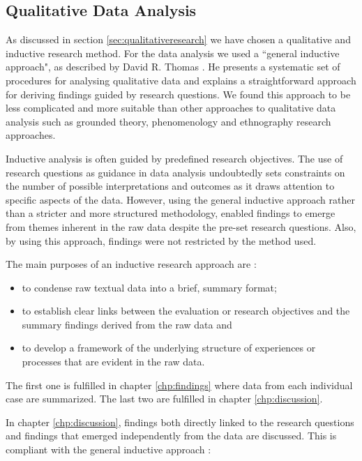 \subsection{Qualitative Data Analysis}
\label{sec:qualitativeAnalysis}
As discussed in section \ref{sec:qualitativeresearch} we have chosen a qualitative and inductive research method. For the data analysis we used a ``general inductive approach", as described by David R. Thomas \cite{thomas2006general}. He presents a systematic set of procedures for analysing qualitative data and explains a straightforward approach for deriving findings guided by research questions. We found this approach to be less complicated and more suitable than other approaches to qualitative data analysis such as grounded theory, phenomenology and ethnography research approaches\cite{thorne2000data}.

Inductive analysis is often guided by predefined research objectives. The use of research questions as guidance in data analysis undoubtedly sets constraints on the number of possible interpretations and outcomes as it draws attention to specific aspects of the data. However, using the general inductive approach rather than a stricter and more structured methodology, enabled findings to emerge from themes inherent in the raw data despite the pre-set research questions. Also, by using this approach, findings were not restricted by the method used. 

The main purposes of an inductive research approach are \cite{thomas2006general}: 
\begin{itemize}
\item to condense raw textual data into a brief, summary format;
\item to establish clear links between the evaluation or research objectives and the summary findings derived from the raw data and
\item to develop a framework of the underlying structure  of experiences or processes that are evident in the raw data.
\end{itemize}
The first one is fulfilled in chapter \ref{chp:findings} where data from each individual case are summarized. The last two are fulfilled in chapter \ref{chp:discussion}.

In chapter \ref{chp:discussion}, findings both directly linked to the research questions and findings that emerged independently from the data are discussed. This is compliant with the general inductive approach \cite{thomas2006general}:

